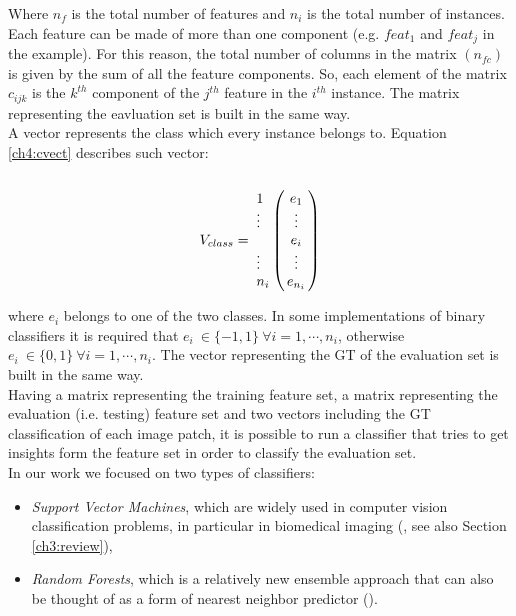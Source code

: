 \noindent Where $n_f$ is the total number of features and $n_i$ is the total number of instances. Each feature can be made of more than one component (e.g. $feat_1$ and $feat_j$ in the example).
For this reason, the total number of columns in the matrix $(n_{fc})$ is given by the sum of all the feature components. So, 
each element of the matrix $c_{ijk}$ is the $k^{th}$ component of the $j^{th}$ feature in the $i^{th}$ instance. The matrix representing the eavluation set is built in the same way.\\
A vector represents the class which every instance belongs to. Equation \ref{ch4:cvect} describes such vector:
\begin{equation}
\label{ch4:cvect}
 V_{class} = \\ \bordermatrix{~ &  ~  \cr
			      \tikzmark{varrowtop} 1 &  \tikzmark{f5} e_{1}  \tikzmark{f6} \cr
			                      \vdots & \vdots \cr
			                       ~     & e_i   \cr
			                      \vdots & \vdots \cr
			      \tikzmark{varrowbottom} n_i & e_{n_i} \cr
			     }
\end{equation}

where $e_i$ belongs to one of the two classes. In some implementations of binary classifiers it is required that $e_i \ \in \{-1,1\} \ \forall i = 1,\cdots,n_i$,
otherwise $e_i \ \in \{0,1\} \ \forall i = 1,\cdots,n_i$. The vector 
representing the \Gls{GT} of the evaluation set is built in the same way.\\
Having a matrix representing the training feature set, a matrix representing the evaluation (i.e. testing) feature set and two vectors including the \Gls{GT}
classification of each image patch, it is possible to run a classifier that tries to get insights form the feature set in order to classify the evaluation set.\\


In our work we focused on two types of classifiers:

\begin{itemize}
 \item \textit{Support Vector Machines}, which are widely used in computer vision classification problems, in particular
in biomedical imaging (\cite{mitosisDetectionLearningBased, SVM02, SVM03, SVMClassHistogram}, see also Section \ref{ch3:review}),
 \item \textit{Random Forests}, which is a relatively new ensemble approach that can also be thought of as a form of nearest neighbor predictor (\cite{randForests03,randForests02,randForests04}).
\end{itemize}

